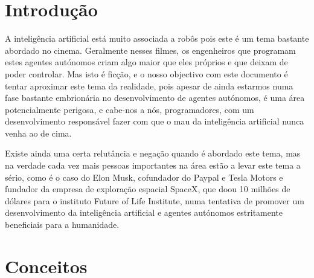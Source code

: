 \documentclass[runningheads,a4paper]{llncs}
\begin{document}
\section{Introdução}

A inteligência artificial está muito associada a robôs pois este é um tema bastante abordado no cinema. Geralmente nesses filmes, os engenheiros que programam estes agentes autónomos criam algo maior que eles próprios e que deixam de poder controlar. Mas isto é ficção, e o nosso objectivo com este documento é tentar aproximar este tema da realidade, pois apesar de ainda estarmos numa fase bastante embrionária no desenvolvimento de agentes autónomos, é uma área potencialmente perigosa, e cabe-nos a nós, programadores, com um desenvolvimento responsável fazer com que o mau da inteligência artificial nunca venha ao de cima.

Existe ainda uma certa relutância e negação quando é abordado este tema, mas na verdade cada vez mais pessoas importantes na área estão a levar este tema a sério, como é o caso do Elon Musk, cofundador do Paypal e Tesla Motors e fundador da empresa de exploração espacial SpaceX, que doou 10 milhões de dólares para o instituto Future of Life Institute, numa tentativa de promover um desenvolvimento da inteligência artificial e agentes autónomos estritamente beneficiais para a humanidade.

\section{Conceitos}

\begin{thebibliography}{4}

\end{thebibliography}
\end{document}
